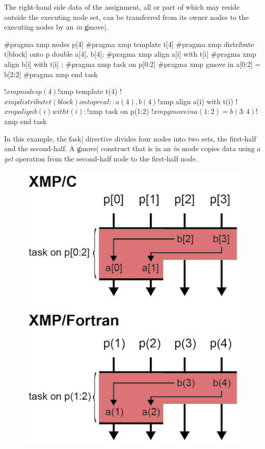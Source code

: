 
The right-hand side data of the assignment, all or part of which may
reside outside the executing node set, can be transferred from its owner
nodes to the executing nodes by an {\it in} \|gmove|.

\begin{XCexample}
#pragma xmp nodes p[4]
#pragma xmp template t[4]
#pragma xmp distribute t[block] onto p
double a[4], b[4];
#pragma xmp align a[i] with t[i]
#pragma xmp align b[i] with t[i]
   :
#pragma xmp task on p[0:2]
#pragma xmp gmove in
  a[0:2] = b[2:2]
#pragma xmp end task
\end{XCexample}

\begin{XFexample}
!$xmp nodes p(4)
!$xmp template t(4)
!$xmp distribute t(block) onto p
real :: a(4), b(4)
!$xmp align a(i) with t(i)
!$xmp align b(i) with t(i)
   :
!$xmp task on p(1:2)
!$xmp gmove in
  a(1:2) = b(3:4)
!$xmp end task
\end{XFexample}

In this example, the \|task| directive divides four nodes into
two sets, the first-half and the second-half. A \|gmove| construct that
is in an {\it in} mode copies data using a {\it get} operation from
the second-half node to the first-half node.

\begin{figure}
  \centering
  \includegraphics{figs/gmove_in.png}
\end{figure}



